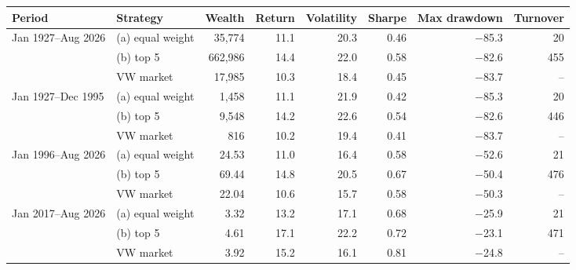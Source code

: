 \begin{tabular}{@{}llrrrrrr@{}}
\toprule
Period & Strategy & Wealth & Return & Volatility & Sharpe & Max drawdown & Turnover \\ \midrule
Jan 1927--Aug 2026 & (a) equal weight & 35,774 & 11.1 & 20.3 & 0.46 & $-$85.3 & 20 \\
 & (b) top 5 & 662,986 & 14.4 & 22.0 & 0.58 & $-$82.6 & 455 \\
 & VW market & 17,985 & 10.3 & 18.4 & 0.45 & $-$83.7 & -- \\
\addlinespace
Jan 1927--Dec 1995 & (a) equal weight & 1,458 & 11.1 & 21.9 & 0.42 & $-$85.3 & 20 \\
 & (b) top 5 & 9,548 & 14.2 & 22.6 & 0.54 & $-$82.6 & 446 \\
 & VW market & 816 & 10.2 & 19.4 & 0.41 & $-$83.7 & -- \\
\addlinespace
Jan 1996--Aug 2026 & (a) equal weight & 24.53 & 11.0 & 16.4 & 0.58 & $-$52.6 & 21 \\
 & (b) top 5 & 69.44 & 14.8 & 20.5 & 0.67 & $-$50.4 & 476 \\
 & VW market & 22.04 & 10.6 & 15.7 & 0.58 & $-$50.3 & -- \\
\addlinespace
Jan 2017--Aug 2026 & (a) equal weight & 3.32 & 13.2 & 17.1 & 0.68 & $-$25.9 & 21 \\
 & (b) top 5 & 4.61 & 17.1 & 22.2 & 0.72 & $-$23.1 & 471 \\
 & VW market & 3.92 & 15.2 & 16.1 & 0.81 & $-$24.8 & -- \\
\bottomrule
\end{tabular}
